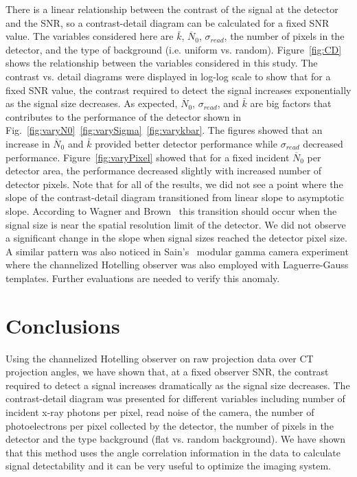 %
%
There is a linear relationship between the contrast of the signal at the detector and the SNR, so a contrast-detail diagram can be calculated for a fixed SNR value.  The variables considered here are $\bar{k}$, $\overline{N}_0$, $\sigma_{read}$, the number of pixels in the detector, and the type of background (i.e. uniform vs. random).  Figure~\ref{fig:CD} shows the relationship between the variables considered in this study.  The contrast vs. detail diagrams were displayed in log-log scale to show that for a fixed SNR value, the contrast required to detect the signal increases exponentially as the signal size decreases.  As expected, $\overline{N}_0$, $\sigma_{read}$, and $\bar{k}$ are big factors that contributes to the performance of the detector shown in Fig.~\ref{fig:varyN0}~\ref{fig:varySigma}~\ref{fig:varykbar}.  The figures showed that an increase in  $\overline{N}_0$ and $\bar{k}$ provided better detector performance while $\sigma_{read}$ decreased performance.  Figure~\ref{fig:varyPixel} showed that for a fixed incident $\overline{N}_0$ per detector area, the performance decreased slightly with increased number of detector pixels.  Note that for all of the results, we did not see a point where the slope of the contrast-detail diagram transitioned from linear slope to asymptotic slope. According to Wagner and Brown~\citep{Wagner1979} this transition should occur when the signal size is near the spatial resolution limit of the detector.  We did not observe a significant change in the slope when signal sizes reached the detector pixel size.  A similar pattern was also noticed in Sain's~\citep{Sain2003} modular gamma camera experiment where the channelized Hotelling observer was also employed with Laguerre-Gauss templates.  Further evaluations are needed to verify this anomaly.

\section{Conclusions}
Using the channelized Hotelling observer on raw projection data over CT projection angles, we have shown that, at a fixed observer SNR, the contrast required to detect a signal increases dramatically as the signal size decreases.  The contrast-detail diagram was presented for different variables including number of incident x-ray photons per pixel, read noise of the camera, the number of photoelectrons per pixel collected by the detector, the number of pixels in the detector and the type background (flat vs. random background).  We have shown that this method uses the angle correlation information in the data to calculate signal detectability and it can be very useful to optimize the imaging system.